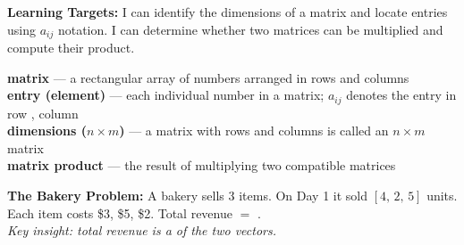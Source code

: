 \documentclass[10pt]{article}
\begin{document}
\namedateperiod

\vspace{0.1in}

\begin{objectivebox}
  \textbf{Learning Targets:}
  I can identify the dimensions of a matrix and locate entries using $a_{ij}$ notation. \quad
  I can determine whether two matrices can be multiplied and compute their product.
\end{objectivebox}

\vspace{0.08in}

\begin{vocabbox}
  \textbf{matrix} --- a rectangular array of numbers arranged in rows and columns\\[3pt]
  \textbf{entry (element)} --- each individual number in a matrix; $a_{ij}$ denotes the entry in row \blank{1.5cm}, column \blank{1.5cm}\\[3pt]
  \textbf{dimensions ($n \times m$)} --- a matrix with \blank{1cm} rows and \blank{1cm} columns is called an $n \times m$ matrix\\[3pt]
  \textbf{matrix product} --- the result of multiplying two compatible matrices
\end{vocabbox}

\vspace{0.08in}

\begin{hookbox}
  \textbf{The Bakery Problem:} A bakery sells 3 items. On Day 1 it sold $[4,\,2,\,5]$ units.
  Each item costs \$3, \$5, \$2. Total revenue $=$ \blank{5cm}.\\[4pt]
  \textit{Key insight: total revenue is a \blank{3cm} of the two vectors.}
\end{hookbox}

\vspace{0.08in}
\end{document}
